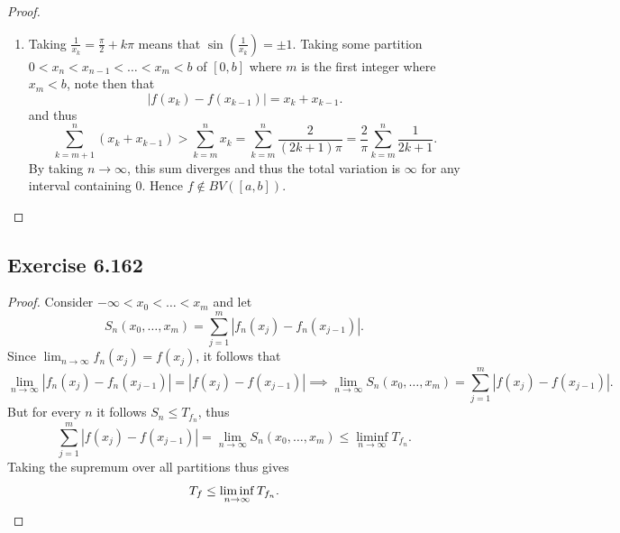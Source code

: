 \documentclass[hw_all.tex]{subfiles}
\begin{document}
\begin{proof}
\begin{enumerate}
        \item 
            Taking $\frac{1}{x_k} = \frac{\pi}{2} + k \pi$ means that $\sin(\frac{1}{x_k}) = \pm 1$. Taking some partition $0 < x_n < x_{n-1} < \ldots < x_m < b$ of $[0,b]$ where $m$ is the first integer where $x_m < b$, note then that
            \[
                |f(x_k) - f(x_{k-1})| = x_k + x_{k-1}
            .\]
            and thus
            \[
                \sum_{k=m+1}^n (x_k + x_{k-1}) > \sum_{k = m}^n x_k = \sum_{k=m}^n \frac{2}{(2k+1) \pi} = \frac{2}{\pi} \sum_{k=m}^n \frac{1}{2k+1}
            .\]
            By taking $n \to \infty$, this sum diverges and thus the total variation is $\infty$ for any interval containing $0$. Hence $f \notin BV([a,b])$.
    \end{enumerate}
\end{proof}

\subsection{Exercise 6.162}
\begin{proof}
    Consider $-\infty < x_0 < \ldots < x_m$ and let
    \[
        S_n(x_0, \ldots, x_m) = \sum_{j = 1}^m |f_n(x_j) - f_n(x_{j-1})|
    .\]
    Since $\lim_{n \to \infty} f_n(x_j) = f(x_j)$, it follows that
    \[
        \lim_{n \to \infty} |f_n(x_j) - f_n(x_{j-1})| = |f(x_j) - f(x_{j-1})| \implies \lim_{n\to \infty} S_n(x_0, \ldots, x_m) = \sum_{j=1}^m |f(x_j) - f(x_{j-1})|
    .\]
    But for every $n$ it follows $S_n \leq T_{f_n}$, thus
    \[
        \sum_{j=1}^m |f(x_j) - f(x_{j-1})| = \lim_{n\to \infty} S_n(x_0, \ldots, x_m) \leq \liminf_{n \to \infty} T_{f_n}
    .\]
    Taking the supremum over all partitions thus gives
    \[
        T_f \leq \liminf_{n \to \infty} T_{f_n}
    . \qedhere\]
\end{proof}
\end{document}
